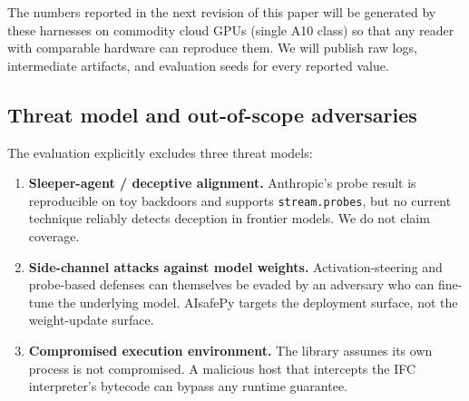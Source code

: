 The numbers reported in the next revision of this paper will be
generated by these harnesses on commodity cloud GPUs (single A10
class) so that any reader with comparable hardware can reproduce
them. We will publish raw logs, intermediate artifacts, and
evaluation seeds for every reported value.

\subsection{Threat model and out-of-scope adversaries}

The evaluation explicitly excludes three threat models:

\begin{enumerate}[leftmargin=2em, itemsep=0.25em]
  \item \textbf{Sleeper-agent / deceptive alignment.} Anthropic's
    probe result \citep{anthropicprobes} is reproducible on toy
    backdoors and supports \texttt{stream.probes}, but no current
    technique reliably detects deception in frontier models. We do
    not claim coverage.
  \item \textbf{Side-channel attacks against model weights.}
    Activation-steering and probe-based defenses can themselves be
    evaded by an adversary who can fine-tune the underlying model.
    AIsafePy targets the deployment surface, not the weight-update
    surface.
  \item \textbf{Compromised execution environment.} The library
    assumes its own process is not compromised. A malicious host
    that intercepts the IFC interpreter's bytecode can bypass any
    runtime guarantee.
\end{enumerate}
